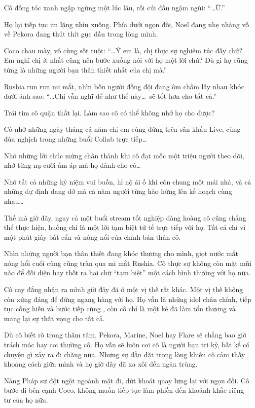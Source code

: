 \documentclass[../main.tex]{subfiles}
\begin{document}
Cô đồng tóc xanh ngập ngừng một lúc lâu, rồi cúi đầu ngậm ngùi: ``\dots Ừ.''

Họ lại tiếp tục im lặng nhìn xuống. Phía dưới ngọn đồi, Noel đang nhẹ nhàng vỗ về Pekora đang thút thít gục đầu trong lòng mình.

Coco chau mày, vô cùng sốt ruột: ``\dots Ý em là, chị thực sự nghiêm túc đấy chứ? Em nghĩ chị ít nhất cũng nên bước xuống nói với họ một lời chứ? Dù gì họ cũng từng là những người bạn thân thiết nhất của chị mà.''

Rushia run run mi mắt, nhìn bốn người đồng đội đang ôm chầm lấy nhau khóc dưới ánh sao: ``\dots Chị vẫn nghĩ để như thế này\dots\ sẽ tốt hơn cho tất cả.''

Trái tim cô quặn thắt lại. Làm sao cô có thể không nhớ họ cho được?

Cô nhớ những ngày tháng cả năm chị em cùng đứng trên sân khấu Live, cùng đùa nghịch trong những buổi Collab trực tiếp\dots

Nhớ những lời chúc mừng chân thành khi cô đạt mốc một triệu người theo dõi, nhớ từng nụ cười ấm áp mà họ dành cho cô\dots

Nhớ tất cả những kỷ niệm vui buồn, hỉ nộ ái ố khi còn chung một mái nhà, và cả những dự định dang dở mà cả năm người từng hào hứng lên kế hoạch cùng nhau\dots

Thế mà giờ đây, ngay cả một buổi stream tốt nghiệp đàng hoàng cô cũng chẳng thể thực hiện, huống chi là một lời tạm biệt tử tế trực tiếp với họ. Tất cả chỉ vì một phút giây bất cẩn và nông nổi của chính bản thân cô.

Nhìn những người bạn thân thiết đang khóc thương cho mình, giọt nước mắt nóng hổi cuối cùng cũng tràn qua mi mắt Rushia. Cô thực sự không còn mặt mũi nào để đối diện hay thốt ra hai chữ ``tạm biệt'' một cách bình thường với họ nữa.

Cô cay đắng nhận ra mình giờ đây đã ở một vị thế rất khác. Một vị thế không còn xứng đáng để đứng ngang hàng với họ. Họ vẫn là những idol chân chính, tiếp tục cống hiến và bước tiếp cùng \hll, còn cô chỉ là một kẻ đã làm tổn thương và mang lại sự thất vọng cho tất cả.

Dù cô biết rõ trong thâm tâm, Pekora, Marine, Noel hay Flare sẽ chẳng bao giờ trách móc hay coi thường cô. Họ vẫn sẽ luôn coi cô là người bạn tri kỷ, bất kể có chuyện gì xảy ra đi chăng nữa. Nhưng sự dằn dặt trong lòng khiến cô cảm thấy khoảng cách giữa mình và họ giờ đây đã xa xôi đến ngàn trùng.

Nàng Pháp sư đột ngột ngoảnh mặt đi, dứt khoát quay lưng lại với ngọn đồi. Cô bước đi bên cạnh Coco, không muốn tiếp tục làm phiền đến khoảnh khắc riêng tư của họ nữa.
\end{document}
